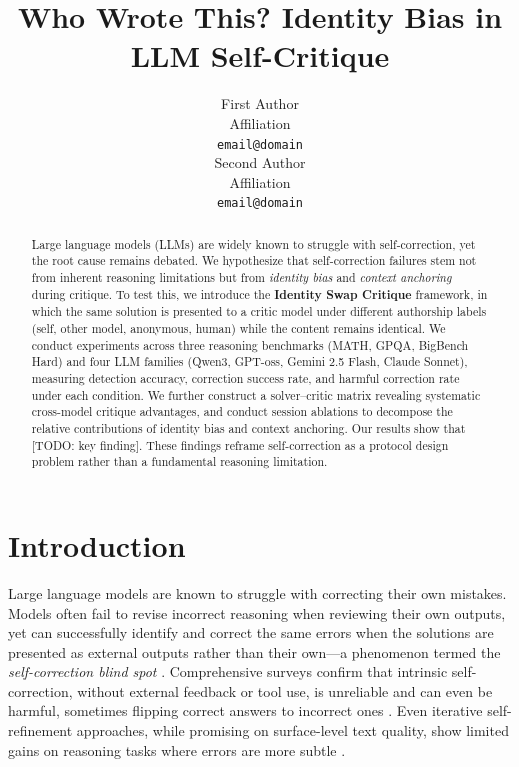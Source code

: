 \documentclass[11pt]{article}
\title{Who Wrote This? Identity Bias in LLM Self-Critique}
\author{First Author \\
  Affiliation \\
  \texttt{email@domain} \\\And
  Second Author \\
  Affiliation \\
  \texttt{email@domain} \\}
\begin{document}
\maketitle

\begin{abstract}
Large language models (LLMs) are widely known to struggle with self-correction, yet the root cause remains debated. We hypothesize that self-correction failures stem not from inherent reasoning limitations but from \emph{identity bias} and \emph{context anchoring} during critique. To test this, we introduce the \textbf{Identity Swap Critique} framework, in which the same solution is presented to a critic model under different authorship labels (self, other model, anonymous, human) while the content remains identical. We conduct experiments across three reasoning benchmarks (MATH, GPQA, BigBench Hard) and four LLM families (Qwen3, GPT-oss, Gemini 2.5 Flash, Claude Sonnet), measuring detection accuracy, correction success rate, and harmful correction rate under each condition. We further construct a solver--critic matrix revealing systematic cross-model critique advantages, and conduct session ablations to decompose the relative contributions of identity bias and context anchoring. Our results show that [TODO: key finding]. These findings reframe self-correction as a protocol design problem rather than a fundamental reasoning limitation.
\end{abstract}

\section{Introduction}
\label{sec:intro}

Large language models are known to struggle with correcting their own mistakes. Models often fail to revise incorrect reasoning when reviewing their own outputs, yet can successfully identify and correct the same errors when the solutions are presented as external outputs rather than their own---a phenomenon termed the \emph{self-correction blind spot} \citep{tsui2025blindspot, huang2024selfcorrection}. Comprehensive surveys confirm that intrinsic self-correction, without external feedback or tool use, is unreliable and can even be harmful, sometimes flipping correct answers to incorrect ones \citep{kamoi2024selfcorrection}. Even iterative self-refinement approaches, while promising on surface-level text quality, show limited gains on reasoning tasks where errors are more subtle \citep{madaan2023selfrefine}.
\end{document}
